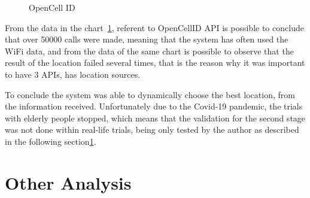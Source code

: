 \begin{figure}[htbp]
  \centering
  \caption{OpenCell ID}
  \label{fig:OpennCellID_chart}
\end{figure}




From the data  in the chart~\ref{fig:OpennCellID_chart}, referent to OpenCellID API is possible to conclude that over 50000 calls were made, meaning that the system has often used the WiFi data, and from the data of the same chart is possible to observe that the result of the location failed several times, that is the reason  why it was important to have 3 APIs, has location sources.

To conclude the system was able to dynamically choose the best location, from the information received. Unfortunately due to the Covid-19 pandemic, the trials with elderly people stopped, which means that the validation for the second stage was not done within real-life trials, being only tested by the author as described in the following section\ref{sec:Other Analysis}.








\newpage
\section{Other Analysis}
\label{sec:Other Analysis}

